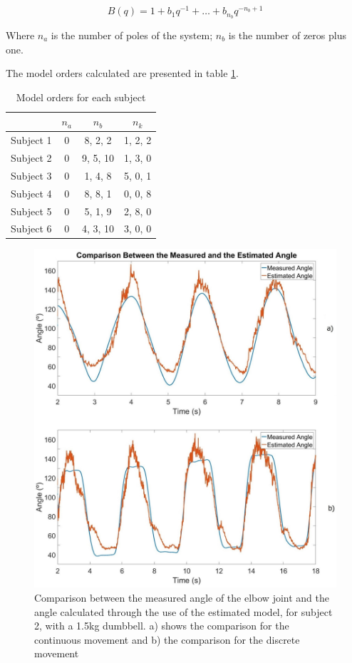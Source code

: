 \documentclass[letterpaper, 10 pt, conference]{ieeeconf}  %
\begin{document}
\begin{equation}
\label{eq:B}
B(q) = 1 + b_1q^{-1}+\dots+b_{n_b}q^{-n_b+1}
\end{equation}


Where \(n_a\) is the number of poles of the system; \(n_b\) is the number of zeros plus one.

The model orders calculated are presented in table \ref{ta:order}.

\begin{table}[h]
\caption{Model orders for each subject}
\label{ta:order}
\centering
\begin{tabular}{|c|c|c|c|}
\hline
 & \(n_a\) & \(n_b\) & \(n_k\)\\
\hline \hline
Subject 1 & 0 & 8, 2, 2 & 1, 2, 2\\
\hline
Subject 2 & 0 & 9, 5, 10 & 1, 3, 0\\
\hline
Subject 3 & 0 & 1, 4, 8 & 5, 0, 1\\
\hline
Subject 4 & 0 & 8, 8, 1 & 0, 0, 8\\
\hline
Subject 5 & 0 & 5, 1, 9 & 2, 8, 0\\
\hline
Subject 6 & 0 & 4, 3, 10 & 3, 0, 0\\
\hline
\end{tabular}
\end{table}

\begin{figure}[thpb]
\vspace{2mm}
      \centering
      \includegraphics[width=0.98\columnwidth]{Images/comparison.jpg}
      \caption{Comparison between the measured angle of the elbow joint and the angle calculated through the use of the estimated model, for subject 2, with a 1.5kg dumbbell. a) shows the comparison for the continuous movement and b) the comparison for the discrete movement}
      \label{Angle Comparison}
   \end{figure}
   
\end{document}
